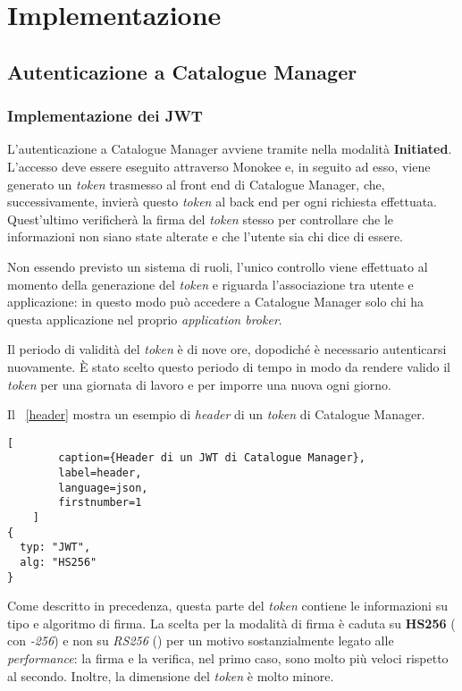 \chapter{Implementazione} \label{implementazione}
\section{Autenticazione a Catalogue Manager}
\subsection{Implementazione dei JWT}
L'autenticazione a Catalogue Manager avviene tramite  nella modalità \textbf{ Initiated}. L'accesso deve essere eseguito attraverso Monokee e, in seguito ad esso, viene generato un \textit{token}  trasmesso al front end di Catalogue Manager, che, successivamente, invierà questo \textit{token} al back end per ogni richiesta effettuata. Quest'ultimo verificherà la firma del \textit{token} stesso per controllare che le informazioni non siano state alterate e che l'utente sia chi dice di essere. 

Non essendo previsto un sistema di ruoli, l'unico controllo viene effettuato al momento della generazione del \textit{token} e riguarda l'associazione tra utente e applicazione: in questo modo può accedere a Catalogue Manager solo chi ha questa applicazione nel proprio \textit{application broker}. 

Il periodo di validità del \textit{token} è di nove ore, dopodiché è necessario autenticarsi nuovamente. È stato scelto questo periodo di tempo in modo da rendere valido il \textit{token} per una giornata di lavoro e per imporre una nuova  ogni giorno.

Il \lstlistingname~\ref{header} mostra un esempio di \textit{header} di un \textit{token} di Catalogue Manager.
\begin{lstlisting}[
		caption={Header di un JWT di Catalogue Manager},
		label=header,
		language=json,
		firstnumber=1
	]
{
  typ: "JWT",
  alg: "HS256"
}
\end{lstlisting}
Come descritto in precedenza, questa parte del \textit{token} contiene le informazioni su tipo e algoritmo di firma. La scelta per la modalità di firma è caduta su \textbf{HS256} ( con \textit{-256}) e non su \textit{RS256} () per un motivo sostanzialmente legato alle \textit{performance}: la firma e la verifica, nel primo caso, sono molto più veloci rispetto al secondo. Inoltre, la dimensione del \textit{token} è molto minore. 

